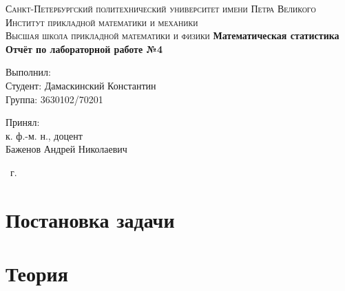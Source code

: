 \documentclass[14pt,a4paper,article]{ncc}
\begin{document}
\begin{titlepage}
    \begin{center}
        \textsc{
            Санкт-Петербургский политехнический университет имени Петра Великого \\[5mm]
            Институт прикладной математики и механики\\[2mm]
            Высшая школа прикладной математики и физики            
        }   
        \vfill
        \textbf{\large
            Математическая статистика\\
            Отчёт по лабораторной работе №4 \\[3mm]
        }                
    \end{center}

    \vfill
    \hfill
    \begin{minipage}{0.5\textwidth}
        Выполнил: \\[2mm]   
		Студент: Дамаскинский Константин \\
		Группа: 3630102/70201\\
    \end{minipage}

	\hfill
	\begin{minipage}{0.5\textwidth}
		Принял: \\[2mm]
		к. ф.-м. н., доцент \\   
		Баженов Андрей Николаевич
	\end{minipage}

    \vfill
    \begin{center}
        \theyear\ г.
    \end{center}
\end{titlepage}

\tableofcontents
\listoffigures
\listoftables
\newpage

\section{Постановка задачи}

\begin{enumerate}




\end{enumerate}

\section{Теория}




\end{document}
